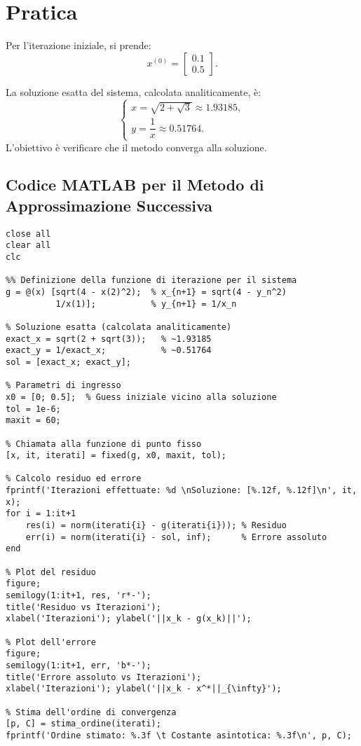 \documentclass[11pt]{article}
\begin{document}
\section*{Pratica}
Per l'iterazione iniziale, si prende:
\[
  x^{(0)} = \begin{bmatrix} 0.1 \\ 0.5 \end{bmatrix}.
\]

La soluzione esatta del sistema, calcolata analiticamente, è:
\[
\begin{cases}
  x = \sqrt{2 + \sqrt{3}} \approx 1.93185, \\
  y = \dfrac{1}{x} \approx 0.51764.
\end{cases}
\]
L'obiettivo è verificare che il metodo converga alla soluzione.

\subsection*{Codice MATLAB per il Metodo di Approssimazione Successiva}

\begin{lstlisting}
close all
clear all
clc

%% Definizione della funzione di iterazione per il sistema
g = @(x) [sqrt(4 - x(2)^2);  % x_{n+1} = sqrt(4 - y_n^2)
          1/x(1)];           % y_{n+1} = 1/x_n

% Soluzione esatta (calcolata analiticamente)
exact_x = sqrt(2 + sqrt(3));   % ~1.93185
exact_y = 1/exact_x;           % ~0.51764
sol = [exact_x; exact_y];

% Parametri di ingresso
x0 = [0; 0.5];  % Guess iniziale vicino alla soluzione
tol = 1e-6;
maxit = 60;

% Chiamata alla funzione di punto fisso
[x, it, iterati] = fixed(g, x0, maxit, tol);

% Calcolo residuo ed errore
fprintf('Iterazioni effettuate: %d \nSoluzione: [%.12f, %.12f]\n', it, x);
for i = 1:it+1
    res(i) = norm(iterati{i} - g(iterati{i})); % Residuo
    err(i) = norm(iterati{i} - sol, inf);      % Errore assoluto
end

% Plot del residuo
figure;
semilogy(1:it+1, res, 'r*-');
title('Residuo vs Iterazioni');
xlabel('Iterazioni'); ylabel('||x_k - g(x_k)||');

% Plot dell'errore
figure;
semilogy(1:it+1, err, 'b*-');
title('Errore assoluto vs Iterazioni');
xlabel('Iterazioni'); ylabel('||x_k - x^*||_{\infty}');

% Stima dell'ordine di convergenza
[p, C] = stima_ordine(iterati); 
fprintf('Ordine stimato: %.3f \t Costante asintotica: %.3f\n', p, C);
\end{lstlisting}
\end{document}
